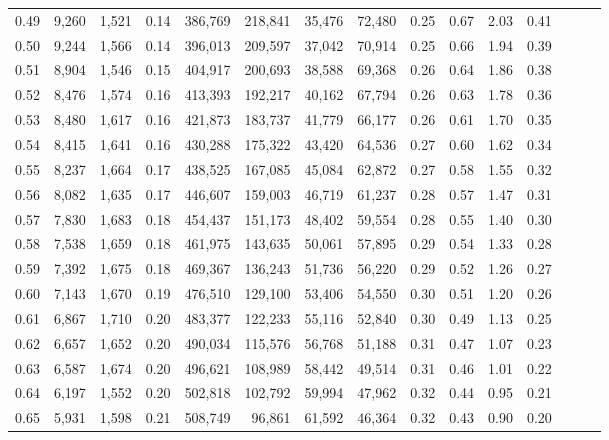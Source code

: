 \begin{tabular}{rrrrrrrrrrrrrrr}
0.49 &   9,260 &  1,521 &  0.14 &  386,769 &  218,841 &   35,476 &   72,480 &  0.25 &  0.67 &  2.03 &      0.41 \\
0.50 &   9,244 &  1,566 &  0.14 &  396,013 &  209,597 &   37,042 &   70,914 &  0.25 &  0.66 &  1.94 &      0.39 \\
0.51 &   8,904 &  1,546 &  0.15 &  404,917 &  200,693 &   38,588 &   69,368 &  0.26 &  0.64 &  1.86 &      0.38 \\
0.52 &   8,476 &  1,574 &  0.16 &  413,393 &  192,217 &   40,162 &   67,794 &  0.26 &  0.63 &  1.78 &      0.36 \\
0.53 &   8,480 &  1,617 &  0.16 &  421,873 &  183,737 &   41,779 &   66,177 &  0.26 &  0.61 &  1.70 &      0.35 \\
0.54 &   8,415 &  1,641 &  0.16 &  430,288 &  175,322 &   43,420 &   64,536 &  0.27 &  0.60 &  1.62 &      0.34 \\
0.55 &   8,237 &  1,664 &  0.17 &  438,525 &  167,085 &   45,084 &   62,872 &  0.27 &  0.58 &  1.55 &      0.32 \\
0.56 &   8,082 &  1,635 &  0.17 &  446,607 &  159,003 &   46,719 &   61,237 &  0.28 &  0.57 &  1.47 &      0.31 \\
0.57 &   7,830 &  1,683 &  0.18 &  454,437 &  151,173 &   48,402 &   59,554 &  0.28 &  0.55 &  1.40 &      0.30 \\
0.58 &   7,538 &  1,659 &  0.18 &  461,975 &  143,635 &   50,061 &   57,895 &  0.29 &  0.54 &  1.33 &      0.28 \\
0.59 &   7,392 &  1,675 &  0.18 &  469,367 &  136,243 &   51,736 &   56,220 &  0.29 &  0.52 &  1.26 &      0.27 \\
0.60 &   7,143 &  1,670 &  0.19 &  476,510 &  129,100 &   53,406 &   54,550 &  0.30 &  0.51 &  1.20 &      0.26 \\
0.61 &   6,867 &  1,710 &  0.20 &  483,377 &  122,233 &   55,116 &   52,840 &  0.30 &  0.49 &  1.13 &      0.25 \\
0.62 &   6,657 &  1,652 &  0.20 &  490,034 &  115,576 &   56,768 &   51,188 &  0.31 &  0.47 &  1.07 &      0.23 \\
0.63 &   6,587 &  1,674 &  0.20 &  496,621 &  108,989 &   58,442 &   49,514 &  0.31 &  0.46 &  1.01 &      0.22 \\
0.64 &   6,197 &  1,552 &  0.20 &  502,818 &  102,792 &   59,994 &   47,962 &  0.32 &  0.44 &  0.95 &      0.21 \\
0.65 &   5,931 &  1,598 &  0.21 &  508,749 &   96,861 &   61,592 &   46,364 &  0.32 &  0.43 &  0.90 &      0.20 \\

\end{tabular}
